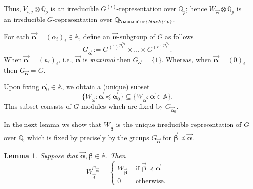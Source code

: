 \documentclass{amsart}
\newcommand{\edit}[1]{\textcolor{black}{#1}}
\newtheorem{lemma}[theorem]{Lemma}
\numberwithin{equation}{section}
\theoremstyle{remark}
\newcommand{\val}{\vec{\boldsymbol{\alpha}}}
\newcommand{\veb}{\vec{\boldsymbol{\beta}}}
\newcommand{\Qp}{\mathbb{Q}_p}
\newcommand{\A}{\mathbb{A}}
\newcommand{\Q}{\mathbb{Q}}
\theoremstyle{plain} %
\begin{document}
Thus, $V_{i,j} \otimes \Qp$ is an irreducible $G^{(i)}$-representation over $\Qp$; hence $W_{\val} \otimes \Qp$ is an irreducible $G$-representation over $\Q_{\edit{p}}$.

For each $\val = (\alpha_i)_i \in \A$, define an $\val$-subgroup of $G$ as follows
\[
G_{\val} := {G^{(1)}}^{p_1^{\alpha_1}} \times \ldots \times {G^{(r)}}^{p_r^{\alpha_r}}.
\]
When $\val = (n_i)_i$, i.e., $\val$ is \emph{maximal} then $G_{\val} = \{1\}$.
Whereas, when $\val = (0)_i$ then $G_{\val} = G$.


Upon fixing $\val_0 \in \A$, we obtain a (unique) subset
\[
\{W_{\val} \colon \val \preccurlyeq \val_0\} \subseteq \{W_{\val} \colon \val \in \A\}.
\]
This subset consists of $G$-modules which are fixed by $G_{\val_0}$.

In the next lemma we show that $W_{\veb}$ is the unique irreducible representation of $G$ over $\Q$, which is fixed by  precisely by the groups $G_{\val}$ for $\veb \preccurlyeq \val$.


\begin{lemma}
\label{lemma 1 for Prop 2 of note 1}
Suppose that $\val, \veb\in \A$.
Then
\[
W_{\veb}^{G_{\val}} = \begin{cases}
W_{\veb} & \text{ if } \veb \preccurlyeq \val\\
0 & \text{ otherwise}.
\end{cases}
\]
\end{lemma}
\end{document}
